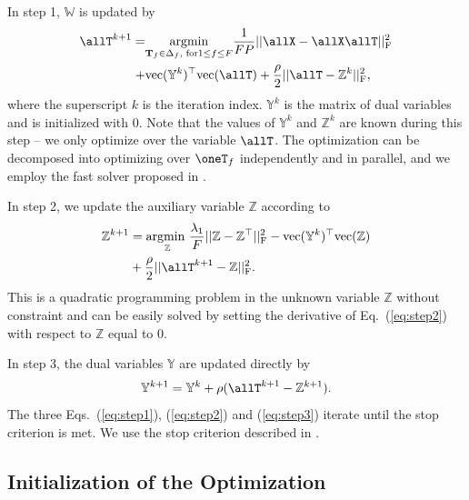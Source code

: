 In step 1, $\mathbb{W}$ is updated by
\begin{equation}
\begin{aligned}
\allT^{k+1}=&\underset{\mathbf{T}_f \in{\Delta_f} \text{, for} 1\leq f\leq F}{\text{argmin}} \frac{1}{FP} ||\allX - \allX\allT||_\text{F}^2 \\+ &\text{vec}(\mathbb{Y}^k)^\top \text{vec} (\allT) + \frac{\rho}{2} ||\allT-\mathbb{Z}^k||_\text{F}^2, \\
\end{aligned}
\label{eq:step1}
\end{equation}
where the superscript $k$ is the iteration index. $\mathbb{Y}^k$ is the matrix of  dual variables and is initialized with 0. Note that the values of $\mathbb{Y}^{k}$ and $\mathbb{Z}^{k}$ are known during this step -- we only optimize over the variable $\allT$. The optimization can be decomposed into optimizing over $\oneT_f$ independently and in parallel, and we employ the fast solver proposed in \cite{chen:hal-00995911}. 

In step 2, we update the auxiliary variable $\mathbb{Z}$ according to
\begin{equation}
\begin{aligned}
\mathbb{Z}^{k+1} &= \underset{\mathbb{Z}}{\text{argmin }} \frac{\lambda_1}{F}||\mathbb{Z} - \mathbb{Z}^\top ||_\text{F}^2 - \text{vec}(\mathbb{Y}^k)^\top \text{vec}(\mathbb{Z}) \\
& + \frac{\rho}{2}||\allT^{k+1}-\mathbb{Z}||_\text{F}^2.
\end{aligned}
\label{eq:step2}
\end{equation}
This is a quadratic programming problem in the unknown variable $\mathbb{Z}$ without constraint and can be easily solved by setting the derivative of Eq.~(\ref{eq:step2}) with respect to $\mathbb{Z}$ equal to 0. 

In step 3, the dual variables $\mathbb{Y}$ are updated directly by
\begin{equation}
\mathbb{Y}^{k+1} = \mathbb{Y}^k + \rho(\allT^{k+1} - \mathbb{Z}^{k+1}).
\label{eq:step3}
\end{equation}
The three Eqs.~(\ref{eq:step1}), (\ref{eq:step2}) and (\ref{eq:step3}) iterate until the stop criterion is met. We use the stop criterion described in \cite{boyd2011distributed}.

\subsection{Initialization of the Optimization}

